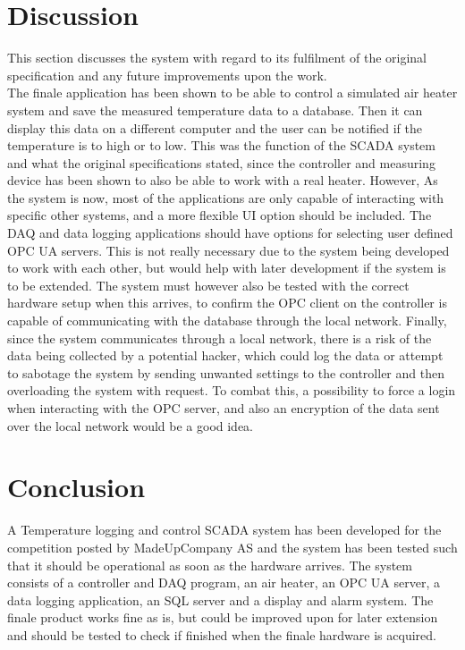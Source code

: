 \documentclass[11pt, A4paper, english]{article}
\numberwithin{equation}{section}
\begin{document}
\begin{multicols}{2}
		\section{Discussion}
This section discusses the system with regard to its fulfilment of the original specification and any future improvements upon the work. \\
The finale application has been shown to be able to control a simulated air heater system and save the measured temperature data to a database. Then it can display this data on a different computer and the user can be notified if the temperature is to high or to low. This was the function of the SCADA system and what the original specifications stated, since the controller and measuring device has been shown to also be able to work with a real heater. However, As the system is now, most of the applications are only capable of interacting with specific other systems, and a more flexible UI option should be included. The DAQ and data logging applications should have options for selecting user defined OPC UA servers. This is not really necessary due to the system being developed to work with each other, but would help with later development if the system is to be extended. The system must however also be tested with the correct hardware setup when this arrives, to confirm the OPC client on the controller is capable of communicating with the database through the local network. Finally, since the system communicates through a local network, there is a risk of the data being collected by a potential hacker, which could log the data or attempt to sabotage the system by sending unwanted settings to the controller and then overloading the system with request. To combat this, a possibility to force a login when interacting with the OPC server, and also an encryption of the data sent over the local network would be a good idea.
		
		\section{Conclusion}
A Temperature logging and control SCADA system has been developed for the competition posted by MadeUpCompany AS and the system has been tested such that it should be operational as soon as the hardware arrives. The system consists of a controller and DAQ program, an air heater, an OPC UA server, a data logging application, an SQL server and a display and alarm system. The finale product works fine as is, but could be improved upon for later extension and should be tested to check if finished when the finale hardware is acquired.
		
\printbibliography
		
	\end{multicols}
\end{document}
